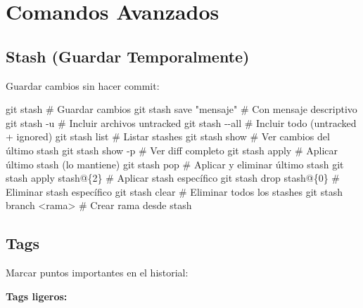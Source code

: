 \documentclass[
  doc,
  floatsintext,
  longtable,
  a4paper,
  nolmodern,
  notxfonts,
  notimes,
  12pt,
  colorlinks=true,linkcolor=blue,citecolor=blue,urlcolor=blue]{apa7}
\newenvironment{Shaded}{\begin{snugshade}}{\end{snugshade}}
\newcommand{\AttributeTok}[1]{\textcolor[rgb]{0.40,0.45,0.13}{#1}}
\newcommand{\CommentTok}[1]{\textcolor[rgb]{0.37,0.37,0.37}{#1}}
\newcommand{\FunctionTok}[1]{\textcolor[rgb]{0.28,0.35,0.67}{#1}}
\newcommand{\NormalTok}[1]{\textcolor[rgb]{0.00,0.23,0.31}{#1}}
\newcommand{\OperatorTok}[1]{\textcolor[rgb]{0.37,0.37,0.37}{#1}}
\newcommand{\StringTok}[1]{\textcolor[rgb]{0.13,0.47,0.30}{#1}}
\begin{document}
\section{Comandos Avanzados}\label{comandos-avanzados}

\subsection{Stash (Guardar
Temporalmente)}\label{stash-guardar-temporalmente}

Guardar cambios sin hacer commit:

\begin{Shaded}
\begin{Highlighting}[]
\FunctionTok{git}\NormalTok{ stash                  }\CommentTok{\# Guardar cambios}
\FunctionTok{git}\NormalTok{ stash save }\StringTok{"mensaje"}   \CommentTok{\# Con mensaje descriptivo}
\FunctionTok{git}\NormalTok{ stash }\AttributeTok{{-}u}               \CommentTok{\# Incluir archivos untracked}
\FunctionTok{git}\NormalTok{ stash }\AttributeTok{{-}{-}all}            \CommentTok{\# Incluir todo (untracked + ignored)}
\FunctionTok{git}\NormalTok{ stash list             }\CommentTok{\# Listar stashes}
\FunctionTok{git}\NormalTok{ stash show             }\CommentTok{\# Ver cambios del último stash}
\FunctionTok{git}\NormalTok{ stash show }\AttributeTok{{-}p}          \CommentTok{\# Ver diff completo}
\FunctionTok{git}\NormalTok{ stash apply            }\CommentTok{\# Aplicar último stash (lo mantiene)}
\FunctionTok{git}\NormalTok{ stash pop              }\CommentTok{\# Aplicar y eliminar último stash}
\FunctionTok{git}\NormalTok{ stash apply stash@\{2\}  }\CommentTok{\# Aplicar stash específico}
\FunctionTok{git}\NormalTok{ stash drop stash@\{0\}   }\CommentTok{\# Eliminar stash específico}
\FunctionTok{git}\NormalTok{ stash clear            }\CommentTok{\# Eliminar todos los stashes}
\FunctionTok{git}\NormalTok{ stash branch }\OperatorTok{\textless{}}\NormalTok{rama}\OperatorTok{\textgreater{}}    \CommentTok{\# Crear rama desde stash}
\end{Highlighting}
\end{Shaded}

\subsection{Tags}\label{tags}

Marcar puntos importantes en el historial:

\textbf{Tags ligeros:}
\end{document}
